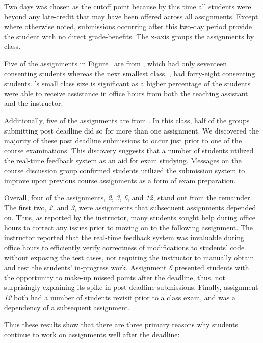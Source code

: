 Two days was chosen as the cutoff point because by this time all students were
beyond any late-credit that may have been offered across all
assignments. Except where otherwise noted, submissions occurring after this
two-day period provide the student with no direct grade-benefits. The x-axis
groups the assignments by class.

Five of the assignments in Figure~ are from ,
which had only seventeen consenting students whereas the next smallest class,
, had forty-eight consenting students. 's small class
size is significant as a higher percentage of the students were able to receive
assistance in office hours from both the teaching assistant and the instructor.

Additionally, five of the assignments are from . In this class, half
of the groups submitting post deadline did so for more than one assignment. We
discovered the majority of these post deadline submissions to occur just prior
to one of the course examinations. This discovery suggests that a number of
students utilized the real-time feedback system as an aid for exam
studying. Messages on the course discussion group confirmed students utilized
the submission system to improve upon previous course assignments as a form of
exam preparation.

Overall, four of the assignments, \emph{2}, \emph{3}, \emph{6}, and \emph{12},
stand out from the remainder. The first two, \emph{2}, and \emph{3}, were
assignments that subsequent assignments depended on. Thus, as reported by the
instructor, many students sought help during office hours to correct any issues
prior to moving on to the following assignment. The instructor reported that
the real-time feedback system was invaluable during office hours to efficiently
verify correctness of modifications to students' code without exposing the test
cases, nor requiring the instructor to manually obtain and test the students'
in-progress work. Assignment \emph{6} presented students with the opportunity
to make-up missed points after the deadline, thus, not surprisingly explaining
its spike in post deadline submissions. Finally, assignment \emph{12} both had
a number of students revisit prior to a class exam, and was a dependency of a
subsequent assignment.

Thus these results show that there are three primary reasons why students
continue to work on assignments well after the deadline:

